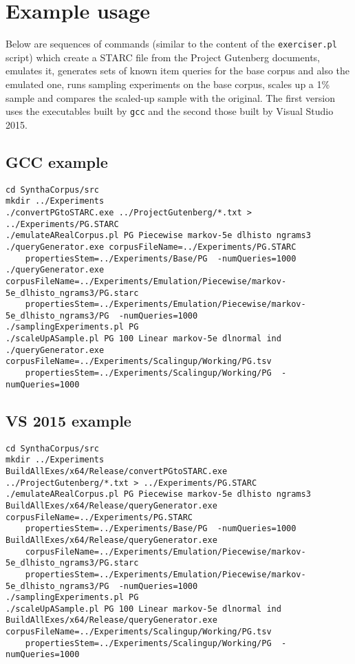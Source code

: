 \documentclass{article}
\begin{document}
\section{Example usage}

Below are sequences of commands (similar to the content of the
\texttt{exerciser.pl} script) which create a STARC file from the Project Gutenberg documents,
emulates it, generates sets of known item queries for the base corpus
and also the emulated one, runs sampling experiments on the base
corpus, scales up a 1\% sample and compares the scaled-up sample with
the original.   The first version uses the executables built by
\texttt{gcc} and the second those built by Visual Studio 2015.
 
\subsection{GCC example}

{\footnotesize
\begin{verbatim}
cd SynthaCorpus/src
mkdir ../Experiments
./convertPGtoSTARC.exe ../ProjectGutenberg/*.txt > ../Experiments/PG.STARC
./emulateARealCorpus.pl PG Piecewise markov-5e dlhisto ngrams3
./queryGenerator.exe corpusFileName=../Experiments/PG.STARC 
    propertiesStem=../Experiments/Base/PG  -numQueries=1000
./queryGenerator.exe corpusFileName=../Experiments/Emulation/Piecewise/markov-5e_dlhisto_ngrams3/PG.starc 
    propertiesStem=../Experiments/Emulation/Piecewise/markov-5e_dlhisto_ngrams3/PG  -numQueries=1000
./samplingExperiments.pl PG
./scaleUpASample.pl PG 100 Linear markov-5e dlnormal ind
./queryGenerator.exe corpusFileName=../Experiments/Scalingup/Working/PG.tsv 
    propertiesStem=../Experiments/Scalingup/Working/PG  -numQueries=1000

\end{verbatim}
}
\subsection{VS 2015 example}

{\footnotesize
\begin{verbatim}
cd SynthaCorpus/src
mkdir ../Experiments
BuildAllExes/x64/Release/convertPGtoSTARC.exe ../ProjectGutenberg/*.txt > ../Experiments/PG.STARC
./emulateARealCorpus.pl PG Piecewise markov-5e dlhisto ngrams3
BuildAllExes/x64/Release/queryGenerator.exe corpusFileName=../Experiments/PG.STARC 
    propertiesStem=../Experiments/Base/PG  -numQueries=1000
BuildAllExes/x64/Release/queryGenerator.exe 
    corpusFileName=../Experiments/Emulation/Piecewise/markov-5e_dlhisto_ngrams3/PG.starc 
    propertiesStem=../Experiments/Emulation/Piecewise/markov-5e_dlhisto_ngrams3/PG  -numQueries=1000
./samplingExperiments.pl PG
./scaleUpASample.pl PG 100 Linear markov-5e dlnormal ind
BuildAllExes/x64/Release/queryGenerator.exe corpusFileName=../Experiments/Scalingup/Working/PG.tsv 
    propertiesStem=../Experiments/Scalingup/Working/PG  -numQueries=1000

\end{verbatim}
}
\end{document}
